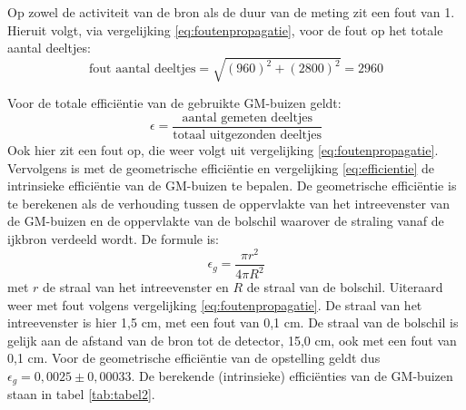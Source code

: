 \documentclass[11pt,a4paper]{article}
\begin{document}
Op zowel de activiteit van de bron als de duur van de meting zit een fout van 1. Hieruit volgt, via vergelijking \ref{eq:foutenpropagatie}, voor de fout op het totale aantal deeltjes:
\begin{equation}
\text{fout aantal deeltjes} = \sqrt{\left(960\right)^2 + \left(2800\right)^2} = 2960
\end{equation}

Voor de totale efficiëntie van de gebruikte GM-buizen geldt:
\begin{equation}
\epsilon = \frac{\text{aantal gemeten deeltjes}}{\text{totaal uitgezonden deeltjes}}
\label{eq:efficientie_GM}
\end{equation}
Ook hier zit een fout op, die weer volgt uit vergelijking \ref{eq:foutenpropagatie}. Vervolgens is met de geometrische efficiëntie en vergelijking \ref{eq:efficientie} de intrinsieke efficiëntie van de GM-buizen te bepalen. De geometrische efficiëntie is te berekenen als de verhouding tussen de oppervlakte van het intreevenster van de GM-buizen en de oppervlakte van de bolschil waarover de straling vanaf de ijkbron verdeeld wordt. De formule is:
\begin{equation}
\epsilon_g = \frac{\pi r^2}{4\pi R^2}
\label{eq:geometrisch}
\end{equation}
met $r$ de straal van het intreevenster en $R$ de straal van de bolschil. Uiteraard weer met fout volgens vergelijking \ref{eq:foutenpropagatie}. De straal van het intreevenster is hier 1,5 cm, met een fout van 0,1 cm. De straal van de bolschil is gelijk aan de afstand van de bron tot de detector, 15,0 cm, ook met een fout van 0,1 cm. Voor de geometrische efficiëntie van de opstelling geldt dus $\epsilon_g = 0,0025 \pm 0,00033$. De berekende (intrinsieke) efficiënties van de GM-buizen staan in tabel \ref{tab:tabel2}.

\begin{table}
\caption{Berekende efficiënties en intrinsieke efficiënties van de GM-buizen, met de bijbehorende fouten. De intrinsieke efficiëntie is bepaald uit de efficiëntie en de geometrische efficiëntie met vergelijking \ref{eq:efficientie}.}
\centering
{}
\label{tab:tabel2}
\end{table}
\end{document}
